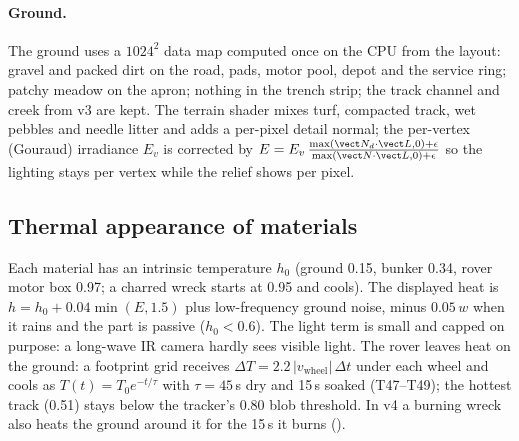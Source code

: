 \paragraph{Ground.} The ground uses a $1024^2$ data map computed once on the CPU from the layout: gravel and
packed dirt on the road, pads, motor pool, depot and the service ring; patchy meadow on the apron; nothing in the
trench strip; the track channel and creek from v3 are kept. The terrain shader mixes turf, compacted track, wet pebbles
and needle litter and adds a per-pixel detail normal; the per-vertex (Gouraud) irradiance $E_v$ is corrected by
$E=E_v\,\frac{\max(\vect N_d\cdot\vect L,0)+\epsilon}{\max(\vect N\cdot\vect L,0)+\epsilon}$ so the lighting stays per vertex
while the relief shows per pixel.

\subsection{Thermal appearance of materials}
Each material has an intrinsic temperature $h_0$ (ground 0.15, bunker 0.34, rover motor box 0.97; a charred wreck starts at
0.95 and cools). The displayed heat is $h=h_0+0.04\min(E,1.5)$ plus low-frequency ground noise, minus $0.05\,w$ when
it rains and the part is passive ($h_0<0.6$). The light term is small and capped on purpose: a long-wave IR camera
hardly sees visible light. The rover leaves heat on the ground: a footprint grid receives $\Delta T=2.2\,|v_\text{wheel}|\,\Delta t$
under each wheel and cools as $T(t)=T_0e^{-t/\tau}$ with $\tau=45$\,s dry and 15\,s soaked (T47--T49); the hottest track (0.51) stays
below the tracker's 0.80 blob threshold. In v4 a burning wreck also heats the ground around it for the 15\,s it burns
().
